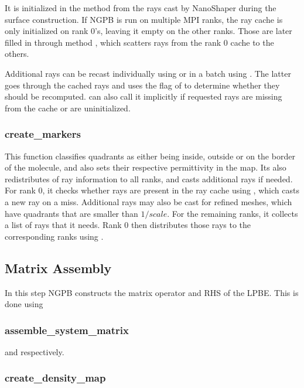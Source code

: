 It is initialized in the method  from the rays cast by NanoShaper during the surface construction. 
If NGPB is run on multiple MPI ranks, the ray cache is only initialized on rank 0's, leaving it empty on the other ranks.
Those are later filled in  through method , which scatters rays from the rank 0 cache to the others. 

Additional rays can be recast individually using  or in a batch using .
The latter goes through the cached rays and uses the  flag of  to determine whether they should be recomputed.
 can also call it implicitly if requested rays are missing from the cache or are uninitialized.

\subsubsection{create\_markers}

This function classifies quadrants as either being inside, outside or on the border of the molecule, and also sets their respective permittivity in the map.
Its also redistributes of ray information to all ranks, and casts additional rays if needed.
For rank 0, it checks whether rays are present in the ray cache using , which casts a new ray on a miss.
Additional rays may also be cast for refined meshes, which have quadrants that are smaller than $1/scale$.
For the remaining ranks, it collects a list of rays that it needs.
Rank 0 then distributes those rays to the corresponding ranks using .

\subsection{Matrix Assembly}
\label{sec:nextgenpb-submodules-matrix-assembly}

In this step NGPB constructs the matrix operator and RHS of the LPBE. 
This is done using \subsubsection{assemble\_system\_matrix} and  respectively.

\subsubsection{create\_density\_map}

